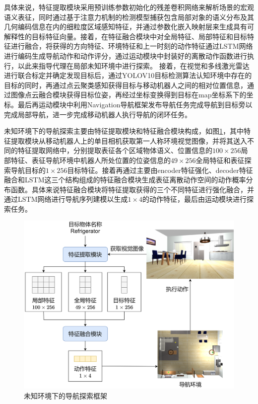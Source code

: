 具体来说，特征提取模块采用预训练参数初始化的残差卷积网络来解析场景的宏观语义表征，同时通过基于注意力机制的检测模型捕获包含局部对象的语义分布及其几何编码信息在内的细粒度区域感知特征，并通过参数化嵌入映射层来生成具有可解释性的目标特征向量。接着，在特征融合模块中对全局特征、局部特征和目标特征进行融合，将获得的方向特征、环境特征和上一时刻的动作特征通过LSTM网络进行编码生成导航动作和动作评分，通过运动模块中封装好的离散动作函数进行执行，以此来指导代理在局部未知环境中进行探索。
接着，在视觉和多线激光雷达进行联合标定并确定发现目标后，通过YOLOV10目标检测算法认知环境中存在的目标的同时，再通过点云聚类感知获得目标与移动机器人之间的相对位置信息，通过图像点云融合模块获得目标位姿，再经过坐标变换得到目标在map坐标系下的坐标。最后再运动模块中利用Navigation导航框架发布导航任务完成导航到目标旁以完成局部导航，进一步完成移动机器人执行导航的闭环任务。

未知环境下的导航探索主要由特征提取模块和特征融合模块构成，如图\ref{提取-融合框架}，其中特征提取模块从移动机器人上的单目相机获取第一人称环境视觉图像，并将其送入不同的特征提取网络中，分别提取表征各个区域物体语义、位置信息的$100 \times 256$局部特征、表征导航环境中机器人所处位置的位姿信息的$49 \times 256$全局特征和表征探索导航目标的$1 \times 256$目标特征。接着再通过主要由encoder特征强化、decoder特征融合和LSTM这三个结构组成的特征融合模块生成表征离散动作空间的动作概率分布函数。具体来说特征融合模块将特征提取获得的三个不同特征进行强化融合，并通过LSTM网络进行导航序列建模以生成$1 \times 4$的动作特征，最后由运动模块进行探索任务。
\begin{figure}[htbp]
    \centering
    \includegraphics[scale=0.11]{Fig/提取-融合框架.png}
    \caption{\label{提取-融合框架}未知环境下的导航探索框架}
\end{figure}

